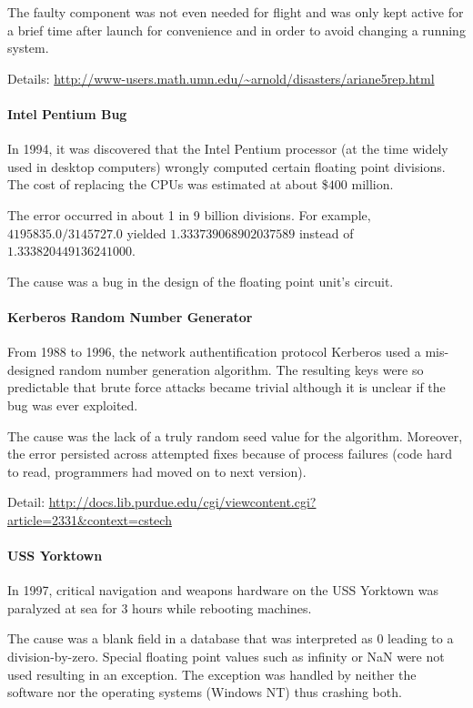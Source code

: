 The faulty component was not even needed for flight and was only kept active for a brief time after launch for convenience and in order to avoid changing a running system.

Details: \url{http://www-users.math.umn.edu/~arnold/disasters/ariane5rep.html}

\paragraph{Intel Pentium Bug}
In 1994, it was discovered that the Intel Pentium processor (at the time widely used in desktop computers) wrongly computed certain floating point divisions.
The cost of replacing the CPUs was estimated at about \$$400$ million.

The error occurred in about 1 in 9 billion divisions.
For example, $4195835.0/3145727.0$ yielded $1.333 739 068 902 037 589$ instead of $1.333 820 449 136 241 000$.

The cause was a bug in the design of the floating point unit's circuit.

\paragraph{Kerberos Random Number Generator}
From 1988 to 1996, the network authentification protocol Kerberos used a mis-designed random number generation algorithm.
The resulting keys were so predictable that brute force attacks became trivial although it is unclear if the bug was ever exploited.

The cause was the lack of a truly random seed value for the algorithm.
Moreover, the error persisted across attempted fixes because of process failures (code hard to read, programmers had moved on to next version).

Detail: \url{http://docs.lib.purdue.edu/cgi/viewcontent.cgi?article=2331&context=cstech}

\paragraph{USS Yorktown}
In 1997, critical navigation and weapons hardware on the USS Yorktown was paralyzed at sea for $3$ hours while rebooting machines.

The cause was a blank field in a database that was interpreted as $0$ leading to a division-by-zero.
Special floating point values such as infinity or NaN were not used resulting in an exception.
The exception was handled by neither the software nor the operating systems (Windows NT) thus crashing both.

